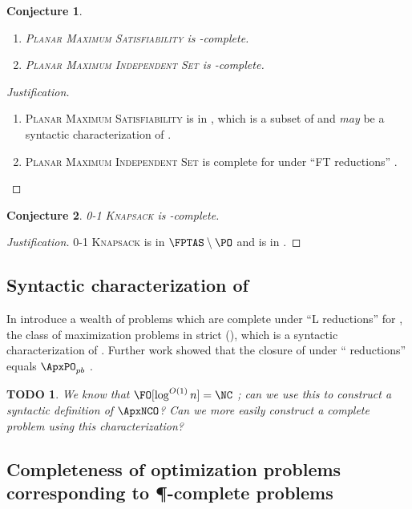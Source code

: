 \documentclass[]{article}
\theoremstyle{plain}
\newtheorem{conjecture}{Conjecture}
\newtheorem{todo}{TODO}
\theoremstyle{definition}
\newenvironment{justification}{\begin{proof}[Justification]}{\end{proof}}
\begin{document}
\begin{conjecture}
  \mbox{}
  \begin{enumerate}
  \item \textsc{Planar Maximum Satisfiability} is \NCAS-complete.
  \item \textsc{Planar Maximum Independent Set} is \NCAS-complete.
  \end{enumerate}
\end{conjecture}
\begin{justification}
  \mbox{}
  \begin{enumerate}
  \item \textsc{Planar Maximum Satisfiability} is in \PMPSAT, which is a subset of \PTAS{} and \emph{may} be a syntactic characterization of \PTAS{} \cite{km96}.
  \item \textsc{Planar Maximum Independent Set} is complete for \PTAS{} under ``FT reductions'' \cite[Theorem~6]{bep06}.
  \end{enumerate}
\end{justification}

\begin{conjecture}
  \textsc{0-1 Knapsack} is \FNCAS-complete.
\end{conjecture}
\begin{justification}
  \textsc{0-1 Knapsack} is in $\FPTAS\setminus\PO$ \cite[Section~3.2]{ep10} and is in \FNCAS{} \cite[Theorem~2]{mayr88}.
\end{justification}

\subsection{Syntactic characterization of \texorpdfstring{\ApxNCO}{ApxNCO}}

In \cite{py91} introduce a wealth of problems which are complete under ``L reductions'' for \MaxSNP, the class of maximization problems in strict \NP{} (\SNP), which is a syntactic characterization of \NP.
Further work showed that the closure of \MaxSNP{} under ``\PTAS{} reductions'' equals $\ApxPO_{pb}$ \cite{kmsv99}.

\begin{todo}
  We know that $\FO[\log^{O(1)} n] = \NC$ \cite{citationneeded}; can we use this to construct a syntactic definition of $\ApxNCO$?
  Can we more easily construct a complete problem using this characterization?
\end{todo}

\subsection{Completeness of optimization problems corresponding to \texorpdfstring{\P}{P}-complete problems}
\label{sec:pcompleteapprox}
\end{document}
